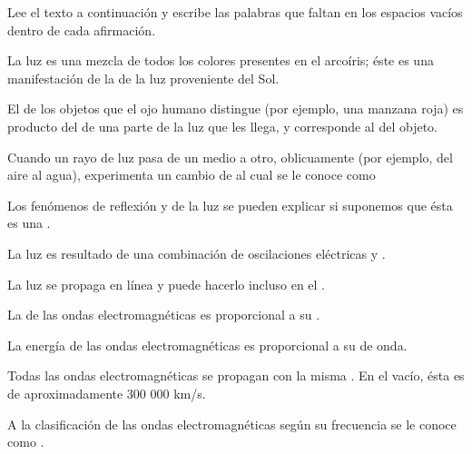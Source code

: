Lee el texto a continuación y escribe las palabras que faltan en los espacios vacíos dentro de cada afirmación.

\begin{parts}
    La luz \fillin[visible][2cm] es una mezcla de todos los colores presentes en el arcoíris;
    éste es una manifestación de la \fillin[descomposición][3cm] de la luz proveniente del Sol.

    El \fillin[color][2cm] de los objetos que el ojo humano distingue (por ejemplo, una
    manzana roja) es producto del \fillin[reflejo][2cm] de una parte de la luz que les llega, y
    corresponde al \fillin[color][2cm] del objeto.

    Cuando un rayo de luz pasa de un medio a otro, oblicuamente (por ejemplo, del aire
    al agua), experimenta un cambio de \fillin[dirección][2cm] al cual se le conoce como \fillin[refracción][2cm]

    Los fenómenos de reflexión y \fillin[refracción][2cm] de la luz se pueden explicar si
    suponemos que ésta es una \fillin[onda][2cm].

    La luz es resultado de una combinación de oscilaciones eléctricas y \fillin[magnéticas][3cm].

    La luz se propaga en línea \fillin[recta][2cm] y puede hacerlo incluso en el \fillin[vacío][2cm].

    La \fillin[energía][2cm] de las ondas electromagnéticas es proporcional a su \fillin[frecuencia][2cm].

    La energía de las ondas electromagnéticas es \fillin[inversamente][3cm] proporcional a su
    \fillin[longitud][2cm] de onda.

    Todas las ondas electromagnéticas se propagan con la misma \fillin[velocidad][2cm]. En el vacío,
    ésta es de aproximadamente 300 000 km/s.

    A la clasificación de las ondas electromagnéticas según su frecuencia se le conoce como .
\end{parts}